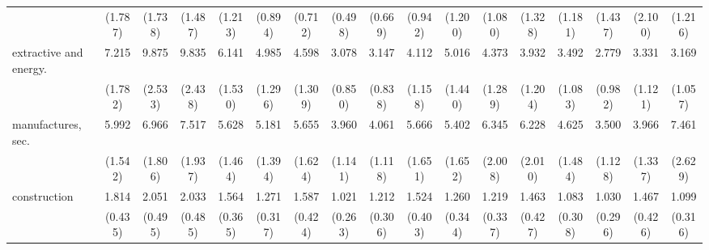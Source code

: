 {\begin{tabular}{l*{16}{c}}
                    &     (1.787)         &     (1.738)         &     (1.487)         &     (1.213)         &     (0.894)         &     (0.712)         &     (0.498)         &     (0.669)         &     (0.942)         &     (1.200)         &     (1.080)         &     (1.328)         &     (1.181)         &     (1.437)         &     (2.100)         &     (1.216)         \\
[1em]
extractive and energy.&       7.215\sym{***}&       9.875\sym{***}&       9.835\sym{***}&       6.141\sym{***}&       4.985\sym{***}&       4.598\sym{***}&       3.078\sym{***}&       3.147\sym{***}&       4.112\sym{***}&       5.016\sym{***}&       4.373\sym{***}&       3.932\sym{***}&       3.492\sym{***}&       2.779\sym{**} &       3.331\sym{***}&       3.169\sym{***}\\
                    &     (1.782)         &     (2.533)         &     (2.438)         &     (1.530)         &     (1.296)         &     (1.309)         &     (0.850)         &     (0.838)         &     (1.158)         &     (1.440)         &     (1.289)         &     (1.204)         &     (1.083)         &     (0.982)         &     (1.121)         &     (1.057)         \\
[1em]
manufactures, sec.  &       5.992\sym{***}&       6.966\sym{***}&       7.517\sym{***}&       5.628\sym{***}&       5.181\sym{***}&       5.655\sym{***}&       3.960\sym{***}&       4.061\sym{***}&       5.666\sym{***}&       5.402\sym{***}&       6.345\sym{***}&       6.228\sym{***}&       4.625\sym{***}&       3.500\sym{***}&       3.966\sym{***}&       7.461\sym{***}\\
                    &     (1.542)         &     (1.806)         &     (1.937)         &     (1.464)         &     (1.394)         &     (1.624)         &     (1.141)         &     (1.118)         &     (1.651)         &     (1.652)         &     (2.008)         &     (2.010)         &     (1.484)         &     (1.128)         &     (1.337)         &     (2.629)         \\
[1em]
construction        &       1.814\sym{*}  &       2.051\sym{**} &       2.033\sym{**} &       1.564         &       1.271         &       1.587         &       1.021         &       1.212         &       1.524         &       1.260         &       1.219         &       1.463         &       1.083         &       1.030         &       1.467         &       1.099         \\
                    &     (0.435)         &     (0.495)         &     (0.485)         &     (0.365)         &     (0.317)         &     (0.424)         &     (0.263)         &     (0.306)         &     (0.403)         &     (0.344)         &     (0.337)         &     (0.427)         &     (0.308)         &     (0.296)         &     (0.426)         &     (0.316)         \\

\end{tabular}}
